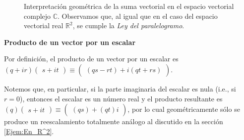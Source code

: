 \documentclass[12pt,dvipsnames]{article}
\begin{document}
\begin{figure}[h!]
    \centering
    \caption{Interpretación geométrica de la suma vectorial en el espacio vectorial complejo $\mathbb{C}$. Observamos que, al igual que en el caso del espacio vectorial real $\mathbb{R}^2$, se cumple la \emph{Ley del paralelogramo}.}
    \label{fig:Suma_vectorial_compleja}
\end{figure}



\vspace{3mm}
\textbf{Producto de un vector por un escalar}
\vspace{3mm}

Por definición, el producto de un vector por un escalar es $(q+ir)\begin{pmatrix}s+it\end{pmatrix}\equiv\begin{pmatrix}(qs-rt)+i(qt+rs)\end{pmatrix}$.

Notemos que, en particular, si la parte imaginaria del escalar es nula (i.e., si $r=0$), entonces el escalar es un número real y el producto resultante es $(q)\begin{pmatrix}s+it\end{pmatrix}\equiv\begin{pmatrix}(qs)+(qt)i\end{pmatrix}$, por lo cual geométricamente sólo se produce un reescalamiento totalmente análogo al discutido en la sección \ref{Ejem:En_R^2}.
\end{document}
